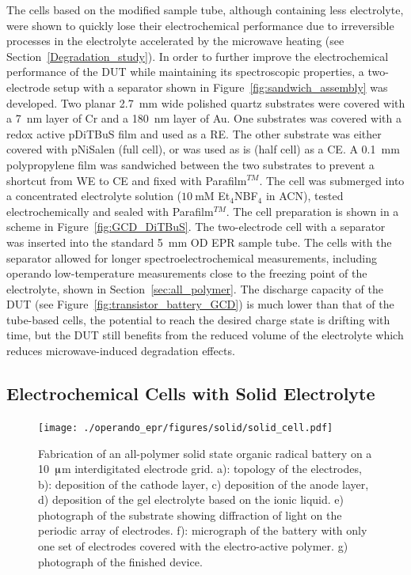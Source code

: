 The cells based on the modified sample tube, although containing less electrolyte, were shown to quickly lose their electrochemical performance due to irreversible processes in the electrolyte accelerated by the microwave heating  (see Section~\ref{Degradation_study}). In order to further improve the electrochemical performance of the DUT while maintaining its spectroscopic properties, a two-electrode setup with a separator shown in Figure~\ref{fig:sandwich_assembly} was developed. Two planar 2.7~mm wide polished quartz substrates were covered with a 7~nm layer of Cr and a 180~nm layer of Au. One substrates was covered with a redox active pDiTBuS film and used as a RE. The other substrate was either covered with pNiSalen (full cell), or was used as is (half cell) as a CE. A 0.1~mm polypropylene film was sandwiched between the two substrates to prevent a shortcut from WE to CE and fixed with Parafilm$^{TM}$. The cell was submerged into a concentrated electrolyte solution ($10~$mM Et$_4$NBF$_4$ in ACN), tested electrochemically and sealed with Parafilm$^{TM}$. The cell preparation is shown in a scheme in Figure~\ref{fig:GCD_DiTBuS}. The two-electrode cell with a separator was inserted into the standard 5~mm OD EPR sample tube. The cells with the separator allowed for longer spectroelectrochemical measurements, including operando low-temperature measurements close to the freezing point of the electrolyte, shown in Section~\ref{sec:all_polymer}. The discharge capacity of the DUT (see Figure~\ref{fig:transistor_battery_GCD}) is much lower than that of the tube-based cells, the potential to reach the desired charge state is drifting with time, but the DUT still benefits from the reduced volume of the electrolyte which reduces microwave-induced degradation effects.

\subsection{Electrochemical Cells with Solid Electrolyte}
\begin{figure}[h]
\center
	\texttt{[image: ./operando\_epr/figures/solid/solid\_cell.pdf]}
	\caption{Fabrication of an all-polymer solid state organic radical battery on a 10~$\muup$m interdigitated electrode grid. a): topology of the electrodes, b): deposition of the cathode layer, c) deposition of the anode layer, d) deposition of the gel electrolyte based on the ionic liquid. e) photograph of the substrate showing diffraction of light on the periodic array of electrodes. f): micrograph of the battery with only one set of electrodes covered with the electro-active polymer. g) photograph of the finished device.}
	\label{fig:transistor_battery_assewmbly}
\end{figure}

